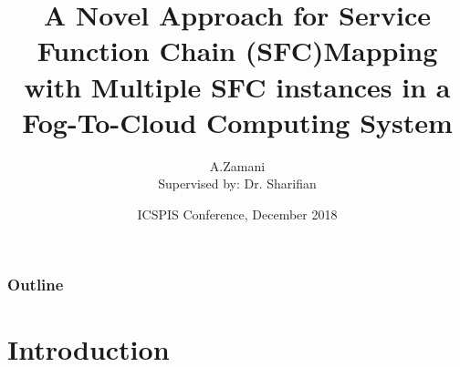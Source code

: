 \documentclass{beamer}
\title[SFC mapping]{A Novel Approach for Service Function Chain (SFC)Mapping with Multiple SFC instances in a Fog-To-Cloud Computing System} %
\author[A.Zamani]{A.Zamani\\[1mm]{\small Supervised by: Dr. Sharifian}} %
\institute[AUT] %
{
Amirkabir University of Technology \\ %
}
\date[ICSPIS, December 2018]{ICSPIS Conference, December 2018} %
\begin{document}
\begin{frame}
\titlepage %
\end{frame}

\begin{frame}
\frametitle{Outline} %
\tableofcontents %
\end{frame}




\section{Introduction}
\end{document}
